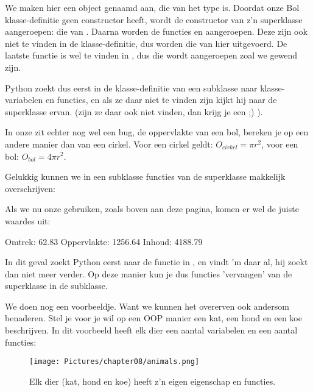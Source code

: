 We maken hier een object genaamd  aan, die van het type  is. Doordat onze Bol klasse-definitie geen constructor heeft, wordt de constructor van z'n superklasse aangeroepen: die van . Daarna worden de functies  en  aangeroepen. Deze zijn ook niet te vinden in de  klasse-definitie, dus worden die van  hier uitgevoerd. De laatste functie  is wel te vinden in , dus die wordt aangeroepen zoal we gewend zijn. \newline

Python zoekt dus eerst in de klasse-definitie van een subklasse naar klasse-variabelen en functies, en als ze daar niet te vinden zijn kijkt hij naar de superklasse ervan. (zijn ze daar ook niet vinden, dan krijg je een  ;) ). \newline

In onze  zit echter nog wel een bug, de oppervlakte van een bol, bereken je op een andere manier dan van een cirkel. Voor een cirkel geldt: $O_{cirkel} = \pi r^2$, voor een bol: $O_{bol} = 4\pi r^2$. \newline

Gelukkig kunnen we in een subklasse functies van de superklasse makkelijk overschrijven:

Als we nu onze  gebruiken, zoals boven aan deze pagina, komen er wel de juiste waardes uit:
\begin{python}
Omtrek: 62.83
Oppervlakte: 1256.64
Inhoud: 4188.79
\end{python}

In dit geval zoekt Python eerst naar de functie  in , en vindt 'm daar al, hij zoekt dan niet meer verder. Op deze manier kun je dus functies 'vervangen' van de superklasse in de subklasse. \newline \newline

We doen nog een voorbeeldje. Want we kunnen het overerven ook andersom benaderen. Stel je voor je wil op een OOP manier een kat, een hond en een koe beschrijven. In dit voorbeeld heeft elk dier een aantal variabelen en een aantal functies: 

\begin{figure}[h!]
\centering\texttt{[image: Pictures/chapter08/animals.png]}
  \caption{\small Elk dier (kat, hond en koe) heeft z'n eigen eigenschap en functies.} 
\label{fig:animals} %
\end{figure}

